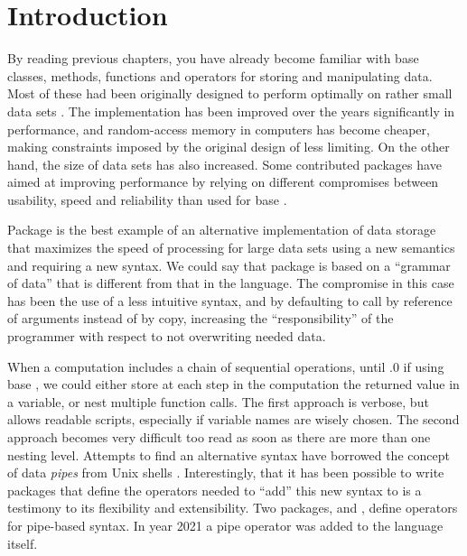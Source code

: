 \documentclass[krantz2]{krantz}\usepackage{knitr}
\begin{document}
\section{Introduction}

By reading previous chapters, you have already become familiar with base \Rlang classes, methods, functions and operators for storing and manipulating data. Most of these had been originally designed to perform optimally on rather small data sets \autocite[see][]{Matloff2011}. The \Rlang implementation has been improved over the years significantly in performance, and random-access memory in computers has become cheaper, making constraints imposed by the original design of \Rlang less limiting. On the other hand, the size of data sets has also increased. Some contributed packages have aimed at improving performance by relying on different compromises between usability, speed and reliability than used for base \Rlang.

Package  is the best example of an alternative implementation of data storage that maximizes the speed of processing for large data sets using a new semantics and requiring a new syntax. We could say that package  is based on a ``grammar of data'' that is different from that in the \Rlang language. The compromise in this case has been the use of a less intuitive syntax, and by defaulting to call by reference of arguments instead of by copy, increasing the ``responsibility'' of the programmer with respect to not overwriting needed data.

When a computation includes a chain of sequential operations, until .0 if using base \Rlang, we could either store at each step in the computation the returned value in a variable, or nest multiple function calls. The first approach is verbose, but allows readable scripts, especially if variable names are wisely chosen. The second approach becomes very difficult too read as soon as there are more than one nesting level. Attempts to find an alternative syntax have borrowed the concept of data \emph{pipes} from Unix shells \autocite{Kernigham1981}. Interestingly, that it has been possible to write packages that define the operators needed to ``add'' this new syntax to \Rlang is a testimony to its flexibility and extensibility. Two packages,  and , define operators for pipe-based syntax. In year 2021 a pipe operator was added to the \Rlang language itself.
\end{document}
